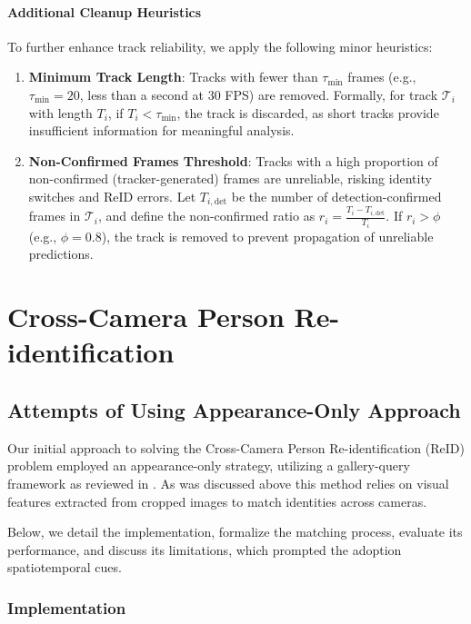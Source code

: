 \documentclass[12pt, a4paper]{article}
\begin{document}
\paragraph{Additional Cleanup Heuristics}
To further enhance track reliability, we apply the following minor heuristics:
\begin{enumerate}
    \item \textbf{Minimum Track Length}: Tracks with fewer than $\tau_{\text{min}}$ frames (e.g., $\tau_{\text{min}} = 20$, less than a second at 30 FPS) are removed. Formally, for track $\mathcal{T}_i$ with length $T_i$, if $T_i < \tau_{\text{min}}$, the track is discarded, as short tracks provide insufficient information for meaningful analysis.
  
    \item \textbf{Non-Confirmed Frames Threshold}: Tracks with a high proportion of non-confirmed (tracker-generated) frames are unreliable, risking identity switches and ReID errors. Let $T_{i,\text{det}}$ be the number of detection-confirmed frames in $\mathcal{T}_i$, and define the non-confirmed ratio as $r_i = \frac{T_i - T_{i,\text{det}}}{T_i}$. If $r_i > \phi$ (e.g., $\phi = 0.8$), the track is removed to prevent propagation of unreliable predictions.
\end{enumerate}

\section{Cross-Camera Person Re-identification}

\subsection{Attempts of Using Appearance-Only Approach}

Our initial approach to solving the Cross-Camera Person Re-identification (ReID) problem employed an appearance-only strategy, utilizing a gallery-query framework as reviewed in \cite{Specker-ReID}. As was discussed above this method relies on visual features extracted from cropped images to match identities across cameras.

Below, we detail the implementation, formalize the matching process, evaluate its performance, and discuss its limitations, which prompted the adoption spatiotemporal cues.

\subsubsection{Implementation}
\end{document}
